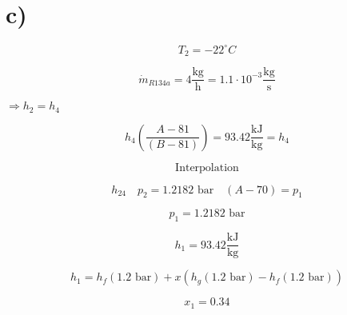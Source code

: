 

\section*{c)}

\[
T_2 = -22^\circ C
\]

\[
\dot{m}_{R134a} = 4 \frac{\text{kg}}{\text{h}} = 1.1 \cdot 10^{-3} \frac{\text{kg}}{\text{s}}
\]

 \(\Rightarrow h_2 = h_4\)

\[
h_4 \left( \frac{A-81}{(B-81)} \right) = 93.42 \frac{\text{kJ}}{\text{kg}} = h_4
\]

\[
\text{Interpolation}
\]

\[
h_{24} \quad p_2 = 1.2182 \text{ bar} \quad (A-70) = p_1
\]

\[
p_1 = 1.2182 \text{ bar}
\]

\[
h_1 = 93.42 \frac{\text{kJ}}{\text{kg}}
\]

\[
h_1 = h_f (1.2 \text{ bar}) + x \left( h_g (1.2 \text{ bar}) - h_f (1.2 \text{ bar}) \right)
\]

\[
x_1 = 0.34
\]